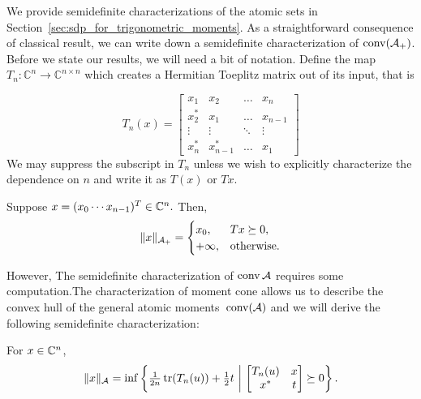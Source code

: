 We provide semidefinite characterizations of the atomic sets in Section~\ref{sec:sdp_for_trigonometric_moments}. As a straightforward consequence of classical result, we can write down a semidefinite
characterization of $\operatorname{conv}(\mathcal{A}_+)$. Before we
state our results, we will need a bit of notation. Define the map
$T_n:\mathbb{C}^n \rightarrow \mathbb{C}^{n\times n}$ which creates a Hermitian
Toeplitz matrix out of its input, that is

\[
T_n(x)= \left[
\begin{array}{ccccc} x_1 & x_2 & \ldots & x_n\\ 
x^*_2 & x_1  & \ldots & x_{n-1}\\
 \vdots & \vdots & \ddots & \vdots\\
 x^*_n & x^*_{n-1}  & \ldots & x_1
 \end{array}\right]
\]
We may suppress the subscript in $T_n$ unless we wish to explicitly characterize the dependence on $n$ and write it as $T(x)$ or $T x$. 
\begin{theorem}
\label{thm:positive-linespect-sdp}
Suppose $x = (x_0 \cdots x_{n-1})^T \in \mathbb{C}^n.$ Then, 
	\[
		\lVert x\rVert_{\mathcal{A}_{+}} = \begin{cases}
			x_0, & T x \succeq 0,\\
			+\infty, & \text{otherwise.}
		\end{cases}
	\]
\end{theorem}

However, The semidefinite characterization of $\operatorname{conv}{\mathcal{A}}$ requires some
computation.The characterization of moment cone allows us to describe the convex
hull of the general atomic moments~$\operatorname{conv}(\mathcal{A})$ and we will derive the following
semidefinite characterization:

\begin{theorem}\label{thm:sdp-char}
	For $x\in \mathbb{C}^n$,
	\begin{equation}
	\label{eq:atomic_sdp}
	\|x\|_{\mathcal{A}} = \inf\left\{ \tfrac{1}{2n} \operatorname{tr}( T_n(u)) +\tfrac{1}{2} t ~\middle|~ \begin{bmatrix}
T_n(u) & x\\
x^* & t
\end{bmatrix} \succeq 0 \right\}.
	\end{equation}
\end{theorem}

